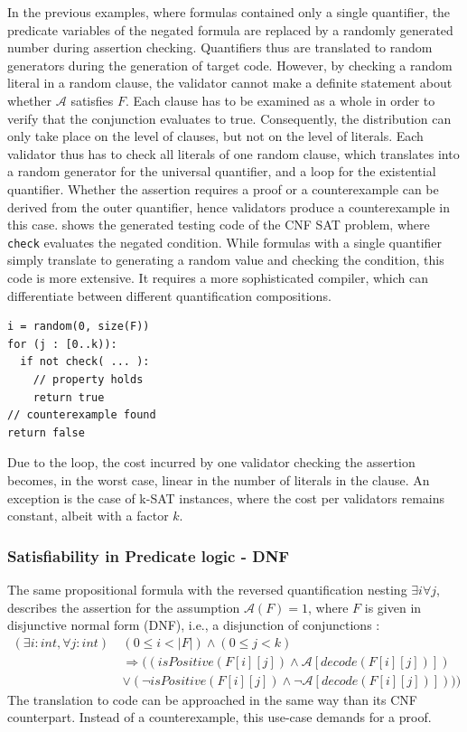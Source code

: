 In the previous examples, where formulas contained only a single quantifier, the predicate variables of the negated formula are replaced by a randomly generated number during assertion checking. Quantifiers thus are translated to random generators during the generation of target code. However, by checking a random literal in a random clause, the validator cannot make a definite statement about whether $\mathcal{A}$ satisfies $F$. Each clause has to be examined as a whole in order to verify that the conjunction evaluates to true. Consequently, the distribution can only take place on the level of clauses, but not on the level of literals. Each validator thus has to check all literals of one random clause, which translates into a random generator for the universal quantifier, and a loop for the existential quantifier. Whether the assertion requires a proof or a counterexample can be derived from the outer quantifier, hence validators produce a counterexample in this case.  shows the generated testing code of the CNF SAT problem, where \texttt{check} evaluates the negated condition. While formulas with a single quantifier simply translate to generating a random value and checking the condition, this code is more extensive. It requires a more sophisticated compiler, which can differentiate between different quantification compositions.

\begin{lstlisting}[label=lst:cnf_test_code, caption=Test code structure for single nested quantifiers, numbers=none]
i = random(0, size(F))
for (j : [0..k)):
  if not check( ... ):
    // property holds
    return true
// counterexample found
return false
\end{lstlisting}

Due to the loop, the cost incurred by one validator checking the assertion becomes, in the worst case, linear in the number of literals in the clause. An exception is the case of k-SAT instances, where the cost per validators remains constant, albeit with a factor $k$. 

\subsubsection{Satisfiability in Predicate logic - DNF}\label{sec:dnf}
The same propositional formula with the reversed quantification nesting $\exists i \forall j$, describes the assertion for the assumption $\mathcal{A}(F) = 1$, where $F$ is given in disjunctive normal form (DNF), i.e., a disjunction of conjunctions \cite{dnf_math_encycl}:
\begin{equation}\label{eq:dnf_sat}
\begin{aligned}
(\exists i : int, \forall j : int) \: &(0 \leq i < |F|) \wedge (0 \leq j < k) \\
&\Rightarrow ((isPositive(F[i][j]) \wedge \mathcal{A}[decode(F[i][j])]) \\
&\vee (\neg isPositive(F[i][j]) \wedge \neg \mathcal{A}[decode(F[i][j])])))
\end{aligned}
\end{equation}
The translation to code can be approached in the same way than its CNF counterpart. Instead of a counterexample, this use-case demands for a proof.

